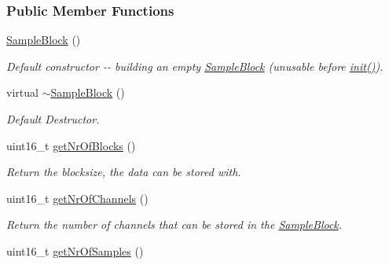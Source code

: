 \subsubsection*{Public Member Functions}
\begin{DoxyCompactItemize}
\item 
\hypertarget{class_sample_block_a293d0fc6db0b4c2489bb1d466bd5aa1d}{
\hyperlink{class_sample_block_a293d0fc6db0b4c2489bb1d466bd5aa1d}{SampleBlock} ()}
\label{class_sample_block_a293d0fc6db0b4c2489bb1d466bd5aa1d}

\begin{DoxyCompactList}\small\item\em Default constructor -\/-\/ building an empty \hyperlink{class_sample_block}{SampleBlock} (unusable before \hyperlink{class_sample_block_aaa6f432732f41a4442aa5c686a47d1ff}{init()}). \item\end{DoxyCompactList}\item 
\hypertarget{class_sample_block_a1041da708c6f36acb8773a02960b930d}{
virtual \hyperlink{class_sample_block_a1041da708c6f36acb8773a02960b930d}{$\sim$SampleBlock} ()}
\label{class_sample_block_a1041da708c6f36acb8773a02960b930d}

\begin{DoxyCompactList}\small\item\em Default Destructor. \item\end{DoxyCompactList}\item 
\hypertarget{class_sample_block_a5084a147b1413e610a1074300decdc1a}{
uint16\_\-t \hyperlink{class_sample_block_a5084a147b1413e610a1074300decdc1a}{getNrOfBlocks} ()}
\label{class_sample_block_a5084a147b1413e610a1074300decdc1a}

\begin{DoxyCompactList}\small\item\em Return the blocksize, the data can be stored with. \item\end{DoxyCompactList}\item 
\hypertarget{class_sample_block_a42988573b881e24c441ac0a316ddc437}{
uint16\_\-t \hyperlink{class_sample_block_a42988573b881e24c441ac0a316ddc437}{getNrOfChannels} ()}
\label{class_sample_block_a42988573b881e24c441ac0a316ddc437}

\begin{DoxyCompactList}\small\item\em Return the number of channels that can be stored in the \hyperlink{class_sample_block}{SampleBlock}. \item\end{DoxyCompactList}\item 
\hypertarget{class_sample_block_a1377bb6219170cb500014c7a4798d85f}{
uint16\_\-t \hyperlink{class_sample_block_a1377bb6219170cb500014c7a4798d85f}{getNrOfSamples} ()}
\label{class_sample_block_a1377bb6219170cb500014c7a4798d85f}


\end{DoxyCompactItemize}
